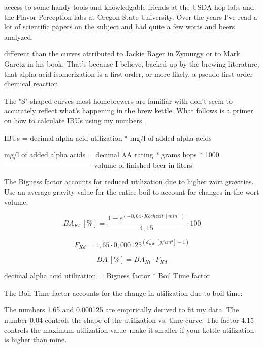 \documentclass[a4paper,parskip=half]{scrartcl}
\newcommand{\BA}{\mathit{BA}}
\newcommand{\BAKt}{{\mathit{BA}}_{\mathit{Kt}}}
\newcommand{\umin}{\:[\mathit{min}]}
\newcommand{\uden}{\:[\mathit{g/cm^3}]}
\newcommand{\uper}{\:[\%]}
\newcommand{\FKd}{F_{\mathit{Kd}}}
\begin{document}
access to some handy tools and knowledgable friends at the USDA hop labs and the Flavor Perception labs at Oregon State University. Over the years I've read a lot of scientific papers on the subject and had quite a few worts and beers analyzed.

different than the curves attributed to Jackie Rager in Zymurgy or to Mark Garetz in his book. That's because I believe, backed up by the brewing literature, that alpha acid isomerization is a first order, or more likely, a pseudo first order chemical reaction

The "S" shaped curves most homebrewers are familiar with don't seem to accurately reflect what's happening in the brew kettle. What follows is a primer on how to calculate IBUs using my numbers.

IBUs = decimal alpha acid utilization * mg/l of added alpha acids

mg/l of added alpha acids = decimal AA rating * grams hops * 1000
                            -------------------------------------
                              volume of finished beer in liters
                              



The Bigness factor accounts for reduced utilization due to higher wort gravities. Use an average gravity value for the entire boil to account for changes in the wort volume.

\begin{equation}
\BAKt \uper = \frac{1 - e^{\left(-0,04 \cdot \mathit{Kochzeit} \umin \right)}}{4,15} \cdot 100
\label{eq:tinsethbakt}
\end{equation}

\begin{equation}
\FKd = 1,65 \cdot 0,000125^{\left(\overline{d_{KW}} \uden - 1 \right)}
\label{eq:tinsethgf}
\end{equation}

\begin{equation}
\BA \uper = \BAKt \cdot \FKd
\label{eq:tinsethba}
\end{equation}

decimal alpha acid utilization = Bigness factor * Boil Time factor

The Boil Time factor accounts for the change in utilization due to boil time:


The numbers 1.65 and 0.000125 are empirically derived to fit my data. The number 0.04 controls the shape of the utilization vs. time curve. The factor 4.15 controls the maximum utilization value--make it smaller if your kettle utilization is higher than mine.
\end{document}
